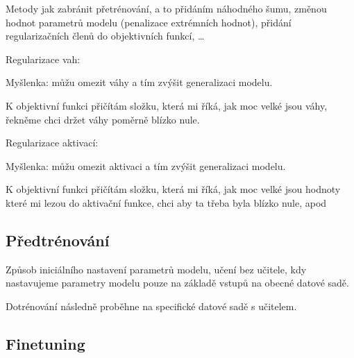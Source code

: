 \begin{compactitem}
    \item Metody jak zabránit přetrénování, a to přidáním náhodného šumu, změnou hodnot parametrů modelu (penalizace extrémních hodnot), přidání regularizačních členů do objektivních funkcí, \dots

    \item Regularizace vah: \begin{compactitem}
        \item Myšlenka: můžu omezit váhy a tím zvýšit generalizaci modelu.

        \item K objektivní funkci přičítám složku, která mi říká, jak moc velké jsou váhy, řekněme chci držet váhy poměrně blízko nule.
    \end{compactitem}

    \item Regularizace aktivací: \begin{compactitem}
        \item Myšlenka: můžu omezit aktivaci a tím zvýšit generalizaci modelu.
        \item K objektivní funkci přičítám složku, která mi říká, jak moc velké jsou hodnoty které mi lezou do aktivační funkce, chci aby ta třeba byla blízko nule, apod
    \end{compactitem}
\end{compactitem}

\subsection{Předtrénování}

\begin{compactitem}
    \item Způsob iniciálního nastavení parametrů modelu, učení bez učitele, kdy nastavujeme parametry modelu pouze na základě vstupů na obecné datové sadě.

    \item Dotrénování následně proběhne na specifické datové sadě s učitelem.
\end{compactitem}

\subsection{Finetuning}

